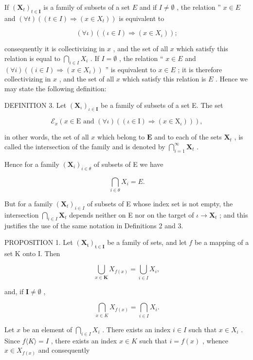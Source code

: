 If \((\mathbf{X}_t)_{t \in \mathbf{I}}\) is a family of subsets of a set \(E\) and if \(I \neq \emptyset\) , the relation '' \(x \in E\) and \((\forall t)((t \in I) \Longrightarrow (x \in X_t))\) is equivalent to

\[
(\forall \iota) ((\iota \in I) \Longrightarrow (x \in X _ {\iota}));
\]

consequently it is collectivizing in \(x\) , and the set of all \(x\) which satisfy this relation is equal to \(\bigcap_{i \in I} X_i\) . If \(I = \emptyset\) , the relation `` \(x \in E\) and \((\forall i)((i \in I) \Longrightarrow (x \in X_i))\) '' is equivalent to \(x \in E\) ; it is therefore collectivizing in \(x\) , and the set of all \(x\) which satisfy this relation is \(E\) . Hence we may state the following definition:

DEFINITION 3. Let \((\mathbf{X}_{\iota})_{\iota \in \mathbf{I}}\) be a family of subsets of a set E. The set

\[
\mathcal {E} _ {x} (x \in \mathrm{E} \text {   and   } (\forall \iota) ((\iota \in \mathrm{I}) \Longrightarrow (x \in \mathrm{X} _ {\iota}))),
\]

in other words, the set of all \(x\) which belong to \(\mathbf{E}\) and to each of the sets \(\mathbf{X}_t\) , is called the intersection of the family and is denoted by \(\bigcap_{i=1}^{\infty} \mathbf{X}_t\) .

Hence for a family \((\mathbf{X}_{i})_{i\in\theta}\) of subsets of E we have

\[
\bigcap_ {i \in \theta} X _ {i} = E.
\]

But for a family \((\mathbf{X}_t)_{i\in I}\) of subsets of E whose index set is not empty, the intersection \(\bigcap_{i\in I}\mathbf{X}_t\) depends neither on E nor on the target of \(\iota \to \mathbf{X}_t\) ; and this justifies the use of the same notation in Definitions 2 and 3.

PROPOSITION 1. Let \((\mathbf{X}_{\mathfrak{t}})_{\mathfrak{t}\in \mathbf{I}}\) be a family of sets, and let \(f\) be a mapping of a set K onto I. Then

\[
\bigcup_ {x \in \mathbf {K}} X _ {f (x)} = \bigcup_ {i \in I} X _ {i},
\]

and, if \(\mathbf{I} \neq \emptyset\) ,

\[
\bigcap_ {x \in K} X _ {f (x)} = \bigcap_ {i \in I} X _ {i}.
\]

Let \(x\) be an element of \(\bigcap_{i \in I} X_i\) . There exists an index \(i \in I\) such that \(x \in X_i\) . Since \(f\langle K \rangle = I\) , there exists an index \(x \in K\) such that \(i = f(x)\) , whence \(x \in X_{f(x)}\) and consequently

